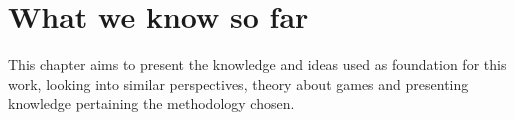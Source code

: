 \chapter{What we know so far}

This chapter aims to present the knowledge and ideas used as foundation for this work, looking into similar perspectives, theory about games and presenting knowledge pertaining the methodology chosen.







